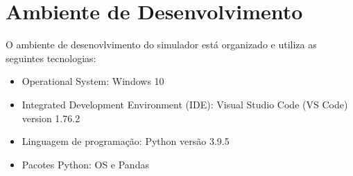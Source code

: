 
\section{Ambiente de Desenvolvimento}

O ambiente de desenovlvimento do simulador está organizado e utiliza as seguintes tecnologias:

\begin{itemize}
    \item Operational System: Windows 10
    \item Integrated Development Environment (IDE): Visual Studio Code (VS Code) version 1.76.2
    \item Linguagem de programação: Python versão 3.9.5
    \item Pacotes Python: OS e Pandas
\end{itemize}
